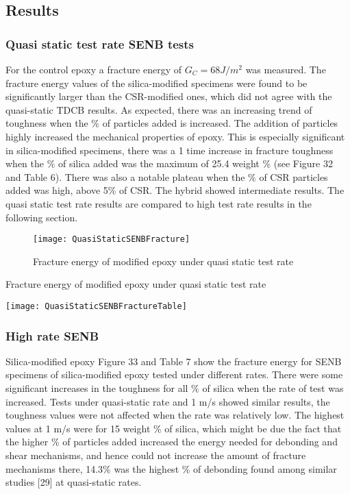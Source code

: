 \documentclass[numbers=noendperiod,chapterprefix=on]{icldt} %
\begin{document}
\subsection{Results}
\subsubsection{Quasi static test rate SENB tests}
For the control epoxy a fracture energy of $G_C = 68 J/m^2$ was measured. The fracture energy values of the silica-modified specimens were found to be significantly larger than the CSR-modified ones, which did not agree with the quasi-static TDCB results. As expected, there was an increasing trend of toughness when the \% of particles added is increased. The addition of particles highly increased the mechanical properties of epoxy. This is especially significant in silica-modified specimens, there was a 1 time increase in fracture toughness when the \% of silica added was the maximum of 25.4 weight \% (see Figure 32 and Table 6). There was also a notable plateau when the \% of CSR particles added was high, above 5\% of CSR. The hybrid showed intermediate results. 
The quasi static test rate results are compared to high test rate results in the following section. 

\begin{figure}[!hp]
\centering
\texttt{[image: QuasiStaticSENBFracture]}
\caption{Fracture energy of modified epoxy under quasi static test rate} %
\end{figure}
\FloatBarrier
\begin{table}[!htpb]
\centering
\caption{Fracture energy of modified epoxy under quasi static test rate } %
\texttt{[image: QuasiStaticSENBFractureTable]}
\end{table}
\FloatBarrier

\subsubsection{High rate SENB}
Silica-modified epoxy
\newline
Figure 33 and Table 7 show the fracture energy for SENB specimens of silica-modified epoxy tested under different rates. There were some significant increases in the toughness for all \% of silica when the rate of test was increased. Tests under quasi-static rate and 1 m/s showed similar results, the toughness values were not affected when the rate was relatively low. The highest values at 1 m/s were for 15 weight \% of silica, which might be due the fact that the higher \% of particles added increased the energy needed for debonding and shear mechanisms, and hence could not increase the amount of fracture mechanisms there, 14.3\% was the highest \% of debonding found among similar studies [29] at quasi-static rates.
\end{document}
